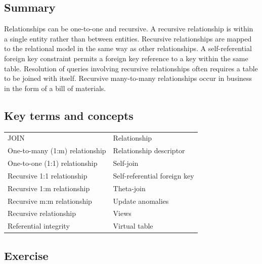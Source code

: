 \documentclass[
]{article}
\begin{document}
\hypertarget{summary-5}{%
\subsection*{Summary}\label{summary-5}}

Relationships can be one-to-one and recursive. A recursive relationship
is within a single entity rather than between entities. Recursive
relationships are mapped to the relational model in the same way as
other relationships. A self-referential foreign key constraint permits a
foreign key reference to a key within the same table. Resolution of
queries involving recursive relationships often requires a table to be
joined with itself. Recursive many-to-many relationships occur in
business in the form of a bill of materials.

\hypertarget{key-terms-and-concepts-3}{%
\subsection*{Key terms and concepts}\label{key-terms-and-concepts-3}}

\begin{longtable}[]{@{}ll@{}}
\toprule
& \\
\midrule
\endhead
JOIN & Relationship \\
One-to-many (1:m) relationship & Relationship descriptor \\
One-to-one (1:1) relationship & Self-join \\
Recursive 1:1 relationship & Self-referential foreign key \\
Recursive 1:m relationship & Theta-join \\
Recursive m:m relationship & Update anomalies \\
Recursive relationship & Views \\
Referential integrity & Virtual table \\
\bottomrule
\end{longtable}

\hypertarget{exercise}{%
\subsection*{Exercise}\label{exercise}}
\end{document}
